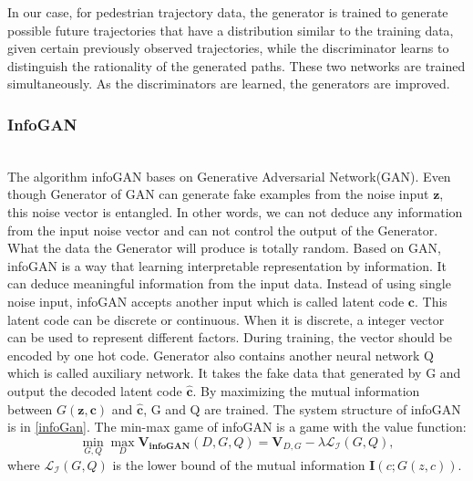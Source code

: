 In our case, for pedestrian trajectory data, the generator is trained to generate possible future trajectories that have a distribution similar to the training data, given certain previously observed trajectories, while the discriminator learns to distinguish the rationality of the generated paths. These two networks are trained simultaneously. As the discriminators are learned, the generators are improved.

\subsubsection{InfoGAN}

\hfill \\
The algorithm infoGAN bases on Generative Adversarial Network(GAN). Even though Generator of GAN can generate fake examples from the noise input \(\mathbf{z}\), this noise vector is entangled. In other words, we can not deduce any information from the input noise vector and can not control the output of the Generator. What the data the Generator will produce is totally random. Based on GAN, infoGAN is a way that learning interpretable representation by information. It can deduce meaningful information from the input data. Instead of using single noise input, infoGAN accepts another input which is called latent code \(\mathbf{c}\). This latent code can be discrete or continuous. When it is discrete, a integer vector can be used to represent different factors. During training, the vector should be encoded by one hot code. Generator also contains another neural network Q which is called auxiliary network. It takes the fake data that generated by G and output the decoded latent code \( \mathbf{\hat{c}}\). By maximizing the mutual information between \( G(\mathbf{z, c})\) and \( \mathbf{\hat{c}}\), G and Q are trained. The system structure of infoGAN is in \ref{infoGan}. The min-max game of infoGAN is a game with the value function\cite{infogan}:
\[\min_{G,Q}\max_{D} \mathbf{V_{infoGAN}}(D, G, Q) = \mathbf{V}_{D, G} - \lambda \mathcal{L_I}(G,Q),\] where \(\mathcal{L_I}(G,Q)\) is the lower bound of the mutual information \(\mathbf{I}(c;G(z,c))\).
